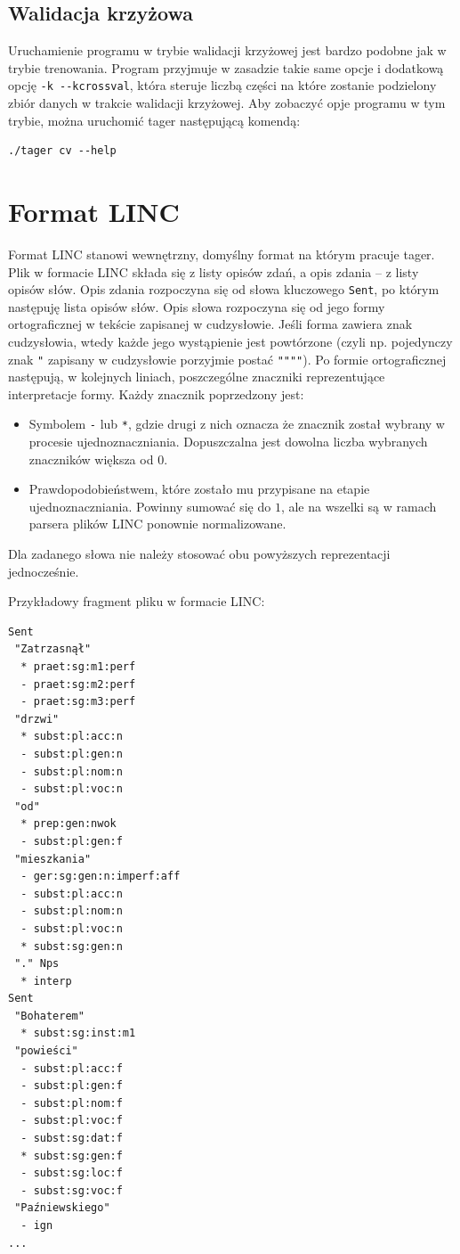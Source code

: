 \documentclass[a4paper,10]{article}
\begin{document}


\subsection{Walidacja krzyżowa}

Uruchamienie programu w trybie walidacji krzyżowej jest bardzo podobne
jak w trybie trenowania. Program przyjmuje w zasadzie takie same opcje
i dodatkową opcję \verb|-k --kcrossval|, która steruje liczbą części
na które zostanie podzielony zbiór danych w trakcie walidacji krzyżowej.
Aby zobaczyć opje programu w tym trybie, można uruchomić tager
następującą komendą:
\begin{verbatim}
./tager cv --help
\end{verbatim}

\section{Format LINC}\label{sec:linc_format}

Format LINC stanowi wewnętrzny, domyślny format na którym pracuje tager.
Plik w formacie LINC składa się z listy opisów zdań, a opis zdania --
z listy opisów słów. Opis zdania rozpoczyna się od słowa kluczowego
\verb|Sent|, po którym następuję lista opisów słów.
Opis słowa rozpoczyna się od jego formy ortograficznej w tekście
zapisanej w cudzysłowie. Jeśli forma zawiera znak cudzysłowia,
wtedy każde jego wystąpienie jest powtórzone (czyli np. pojedynczy
znak \verb|"| zapisany w cudzysłowie porzyjmie postać \verb|""""|).
Po formie ortograficznej następują, w kolejnych liniach, 
poszczególne znaczniki reprezentujące interpretacje formy. 
Każdy znacznik poprzedzony jest:
\begin{itemize}
\item Symbolem \verb|-| lub \verb|*|, gdzie drugi z nich oznacza
  że znacznik został wybrany w procesie ujednoznaczniania.
  Dopuszczalna jest dowolna liczba wybranych znaczników większa
  od $0$.
\item Prawdopodobieństwem, które zostało mu przypisane
  na etapie ujednoznaczniania. Powinny sumować się do $1$,
  ale na wszelki są w ramach parsera plików LINC ponownie
  normalizowane.
\end{itemize}
Dla zadanego słowa nie należy stosować obu powyższych reprezentacji
jednocześnie.

Przykładowy fragment pliku w formacie LINC: 
\begin{verbatim}
Sent
 "Zatrzasnął"
  * praet:sg:m1:perf
  - praet:sg:m2:perf
  - praet:sg:m3:perf
 "drzwi"
  * subst:pl:acc:n
  - subst:pl:gen:n
  - subst:pl:nom:n
  - subst:pl:voc:n
 "od"
  * prep:gen:nwok
  - subst:pl:gen:f
 "mieszkania"
  - ger:sg:gen:n:imperf:aff
  - subst:pl:acc:n
  - subst:pl:nom:n
  - subst:pl:voc:n
  * subst:sg:gen:n
 "." Nps
  * interp
Sent
 "Bohaterem"
  * subst:sg:inst:m1
 "powieści"
  - subst:pl:acc:f
  - subst:pl:gen:f
  - subst:pl:nom:f
  - subst:pl:voc:f
  - subst:sg:dat:f
  * subst:sg:gen:f
  - subst:sg:loc:f
  - subst:sg:voc:f
 "Paźniewskiego"
  - ign
...
\end{verbatim}
\end{document}
